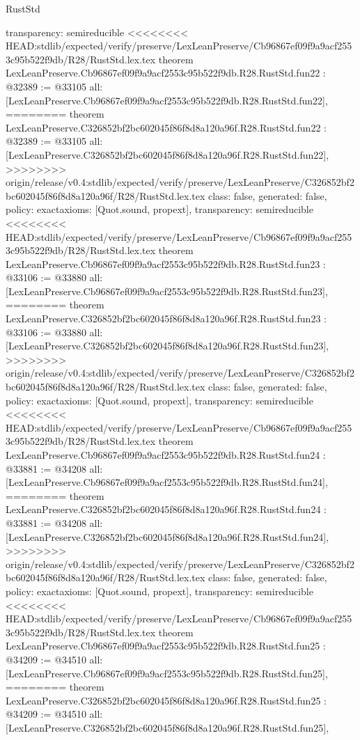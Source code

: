 \begin{lexlean}{RustStd}
\begin{coremodule}
{\begin{coremodule}
{{{{{{{{{{{{{{{{{{{{{{{{{  transparency: semireducible
}
<<<<<<<< HEAD:stdlib/expected/verify/preserve/LexLeanPreserve/Cb96867ef09f9a9acf2553c95b522f9db/R28/RustStd.lex.tex
theorem LexLeanPreserve.Cb96867ef09f9a9acf2553c95b522f9db.R28.RustStd.fun22 : @32389 := @33105 {
  all: [LexLeanPreserve.Cb96867ef09f9a9acf2553c95b522f9db.R28.RustStd.fun22],
========
theorem LexLeanPreserve.C326852bf2bc602045f86f8d8a120a96f.R28.RustStd.fun22 : @32389 := @33105 {
  all: [LexLeanPreserve.C326852bf2bc602045f86f8d8a120a96f.R28.RustStd.fun22],
>>>>>>>> origin/release/v0.4:stdlib/expected/verify/preserve/LexLeanPreserve/C326852bf2bc602045f86f8d8a120a96f/R28/RustStd.lex.tex
  class: false,
  generated: false,
  policy: exact{axioms: [Quot.sound, propext]},
  transparency: semireducible
}
<<<<<<<< HEAD:stdlib/expected/verify/preserve/LexLeanPreserve/Cb96867ef09f9a9acf2553c95b522f9db/R28/RustStd.lex.tex
theorem LexLeanPreserve.Cb96867ef09f9a9acf2553c95b522f9db.R28.RustStd.fun23 : @33106 := @33880 {
  all: [LexLeanPreserve.Cb96867ef09f9a9acf2553c95b522f9db.R28.RustStd.fun23],
========
theorem LexLeanPreserve.C326852bf2bc602045f86f8d8a120a96f.R28.RustStd.fun23 : @33106 := @33880 {
  all: [LexLeanPreserve.C326852bf2bc602045f86f8d8a120a96f.R28.RustStd.fun23],
>>>>>>>> origin/release/v0.4:stdlib/expected/verify/preserve/LexLeanPreserve/C326852bf2bc602045f86f8d8a120a96f/R28/RustStd.lex.tex
  class: false,
  generated: false,
  policy: exact{axioms: [Quot.sound, propext]},
  transparency: semireducible
}
<<<<<<<< HEAD:stdlib/expected/verify/preserve/LexLeanPreserve/Cb96867ef09f9a9acf2553c95b522f9db/R28/RustStd.lex.tex
theorem LexLeanPreserve.Cb96867ef09f9a9acf2553c95b522f9db.R28.RustStd.fun24 : @33881 := @34208 {
  all: [LexLeanPreserve.Cb96867ef09f9a9acf2553c95b522f9db.R28.RustStd.fun24],
========
theorem LexLeanPreserve.C326852bf2bc602045f86f8d8a120a96f.R28.RustStd.fun24 : @33881 := @34208 {
  all: [LexLeanPreserve.C326852bf2bc602045f86f8d8a120a96f.R28.RustStd.fun24],
>>>>>>>> origin/release/v0.4:stdlib/expected/verify/preserve/LexLeanPreserve/C326852bf2bc602045f86f8d8a120a96f/R28/RustStd.lex.tex
  class: false,
  generated: false,
  policy: exact{axioms: [Quot.sound, propext]},
  transparency: semireducible
}
<<<<<<<< HEAD:stdlib/expected/verify/preserve/LexLeanPreserve/Cb96867ef09f9a9acf2553c95b522f9db/R28/RustStd.lex.tex
theorem LexLeanPreserve.Cb96867ef09f9a9acf2553c95b522f9db.R28.RustStd.fun25 : @34209 := @34510 {
  all: [LexLeanPreserve.Cb96867ef09f9a9acf2553c95b522f9db.R28.RustStd.fun25],
========
theorem LexLeanPreserve.C326852bf2bc602045f86f8d8a120a96f.R28.RustStd.fun25 : @34209 := @34510 {
  all: [LexLeanPreserve.C326852bf2bc602045f86f8d8a120a96f.R28.RustStd.fun25],
}}}}}}}}}}}}}}}}}}}}}}}}}}}}}
\end{coremodule}}
\end{coremodule}
\end{lexlean}
